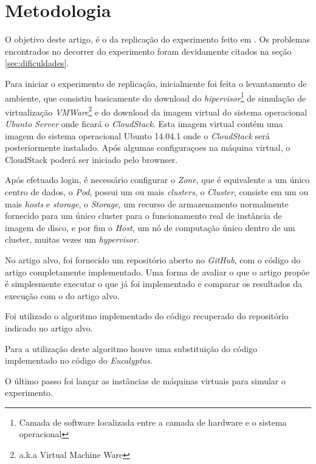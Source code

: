 \section{Metodologia}

O objetivo deste artigo, é o da replicação do experimento feito em \cite{coutinho_et_al:14}. Os problemas encontrados no decorrer do experimento foram devidamente citados na seção \ref{sec:dificuldades}.

Para iniciar o experimento de replicação, inicialmente foi feita o levantamento de ambiente, que consistiu basicamente do download do \textit{hipervisor}\footnote{Camada de software localizada entre a camada de hardware e o sistema operacional\cite{dev_midia}} de simulação de virtualização \textit{VMWare}\footnote{a.k.a Virtual Machine Ware} e do download da imagem virtual do sistema operacional \textit{Ubunto Server} onde ficará o \textit{CloudStack}. Esta imagem virtual contém uma imagem do sistema operacional Ubunto 14.04.1 onde o \textit{CloudStack} será posteriormente instalado. Após algumas configuraçoes na máquina virtual, o CloudStack poderá ser iniciado pelo brownser. 

Após efetuado login, é necessário configurar o \textit{Zone}, que é equivalente a um único centro de dados, o \textit{Pod}, possui um ou mais \textit{clusters}, o \textit{Cluster}, consiste em um ou mais \textit{hosts} e \textit{storage}, o \textit{Storage}, um recurso de armazenamento normalmente fornecido para um único cluster para o funcionamento real de instância de imagem de disco, e por fim o \textit{Host}, um nó de computação único dentro de um cluster, muitas vezes um \textit{hypervisor}.

No artigo alvo, foi fornecido um repositório aberto no \textit{GitHub}, com o código do artigo completamente implementado. Uma forma de avaliar o que o artigo propõe é simplesmente executar o que já foi implementado e comparar os resultados da execução com o do artigo alvo.

Foi utilizado o algoritmo implementado do código recuperado do repositório indicado no artigo alvo.

Para a utilização deste algoritmo houve uma substituição do código implementado no código do \textit{Eucalyptus}.

O último passo foi lançar as instâncias de máquinas virtuais para simular o experimento. 

